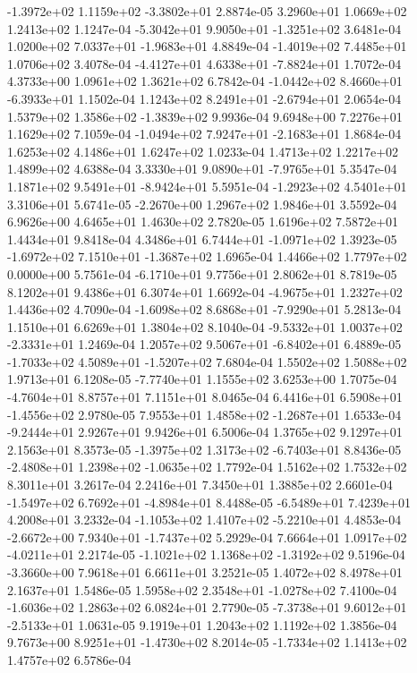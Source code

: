 -1.3972e+02  1.1159e+02 -3.3802e+01  2.8874e-05
3.2960e+01 1.0669e+02 1.2413e+02  1.1247e-04
-5.3042e+01  9.9050e+01 -1.3251e+02  3.6481e-04
 1.0200e+02  7.0337e+01 -1.9683e+01  4.8849e-04
-1.4019e+02  7.4485e+01  1.0706e+02  3.4078e-04
-4.4127e+01  4.6338e+01 -7.8824e+01  1.7072e-04
4.3733e+00 1.0961e+02 1.3621e+02  6.7842e-04
-1.0442e+02  8.4660e+01 -6.3933e+01  1.1502e-04
 1.1243e+02  8.2491e+01 -2.6794e+01  2.0654e-04
 1.5379e+02  1.3586e+02 -1.3839e+02  9.9936e-04
9.6948e+00 7.2276e+01 1.1629e+02  7.1059e-04
-1.0494e+02  7.9247e+01 -2.1683e+01  1.8684e-04
1.6253e+02 4.1486e+01 1.6247e+02  1.0233e-04
1.4713e+02 1.2217e+02 1.4899e+02  4.6388e-04
 3.3330e+01  9.0890e+01 -7.9765e+01  5.3547e-04
 1.1871e+02  9.5491e+01 -8.9424e+01  5.5951e-04
-1.2923e+02  4.5401e+01  3.3106e+01  5.6741e-05
-2.2670e+00  1.2967e+02  1.9846e+01  3.5592e-04
6.9626e+00 4.6465e+01 1.4630e+02  2.7820e-05
1.6196e+02 7.5872e+01 1.4434e+01  9.8418e-04
 4.3486e+01  6.7444e+01 -1.0971e+02  1.3923e-05
-1.6972e+02  7.1510e+01 -1.3687e+02  1.6965e-04
1.4466e+02 1.7797e+02 0.0000e+00  5.7561e-04
-6.1710e+01  9.7756e+01  2.8062e+01  8.7819e-05
8.1202e+01 9.4386e+01 6.3074e+01  1.6692e-04
-4.9675e+01  1.2327e+02  1.4436e+02  4.7090e-04
-1.6098e+02  8.6868e+01 -7.9290e+01  5.2813e-04
1.1510e+01 6.6269e+01 1.3804e+02  8.1040e-04
-9.5332e+01  1.0037e+02 -2.3331e+01  1.2469e-04
 1.2057e+02  9.5067e+01 -6.8402e+01  6.4889e-05
-1.7033e+02  4.5089e+01 -1.5207e+02  7.6804e-04
1.5502e+02 1.5088e+02 1.9713e+01  6.1208e-05
-7.7740e+01  1.1555e+02  3.6253e+00  1.7075e-04
-4.7604e+01  8.8757e+01  7.1151e+01  8.0465e-04
 6.4416e+01  6.5908e+01 -1.4556e+02  2.9780e-05
 7.9553e+01  1.4858e+02 -1.2687e+01  1.6533e-04
-9.2444e+01  2.9267e+01  9.9426e+01  6.5006e-04
1.3765e+02 9.1297e+01 2.1563e+01  8.3573e-05
-1.3975e+02  1.3173e+02 -6.7403e+01  8.8436e-05
-2.4808e+01  1.2398e+02 -1.0635e+02  1.7792e-04
1.5162e+02 1.7532e+02 8.3011e+01  3.2617e-04
2.2416e+01 7.3450e+01 1.3885e+02  2.6601e-04
-1.5497e+02  6.7692e+01 -4.8984e+01  8.4488e-05
-6.5489e+01  7.4239e+01  4.2008e+01  3.2332e-04
-1.1053e+02  1.4107e+02 -5.2210e+01  4.4853e-04
-2.6672e+00  7.9340e+01 -1.7437e+02  5.2929e-04
 7.6664e+01  1.0917e+02 -4.0211e+01  2.2174e-05
-1.1021e+02  1.1368e+02 -1.3192e+02  9.5196e-04
-3.3660e+00  7.9618e+01  6.6611e+01  3.2521e-05
1.4072e+02 8.4978e+01 2.1637e+01  1.5486e-05
 1.5958e+02  2.3548e+01 -1.0278e+02  7.4100e-04
-1.6036e+02  1.2863e+02  6.0824e+01  2.7790e-05
-7.3738e+01  9.6012e+01 -2.5133e+01  1.0631e-05
9.1919e+01 1.2043e+02 1.1192e+02  1.3856e-04
 9.7673e+00  8.9251e+01 -1.4730e+02  8.2014e-05
-1.7334e+02  1.1413e+02  1.4757e+02  6.5786e-04
